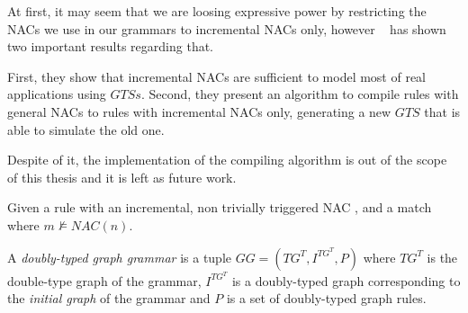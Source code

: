 At first, it may seem that we are loosing expressive power by restricting the NACs we use in our grammars to incremental NACs only, however ~\cite{Corradini2013} has shown two important results regarding that.

First, they show that incremental NACs are sufficient to model most of real applications using $GTSs$. Second, they present an algorithm to compile rules with general NACs to rules with incremental NACs only, generating a new $GTS$ that is able to simulate the old one.

Despite of it, the implementation of the compiling algorithm is out of the scope of this thesis and it is left as future work.

\begin{definition} Given a rule \graphrule{} with an incremental, non trivially triggered NAC \nac{}, and a match \match{} where $m \not\models NAC(n)$.
\end{definition}


\begin{definition} A \emph{doubly-typed graph grammar} is a tuple $GG = \left(TG^T, I^{TG^T},P \right)$ where $TG^T$ is the double-type graph of the grammar, $I^{TG^T}$ is a doubly-typed graph corresponding to the \emph{initial graph} of the grammar and $P$ is a set of doubly-typed graph rules. 
\end{definition}


